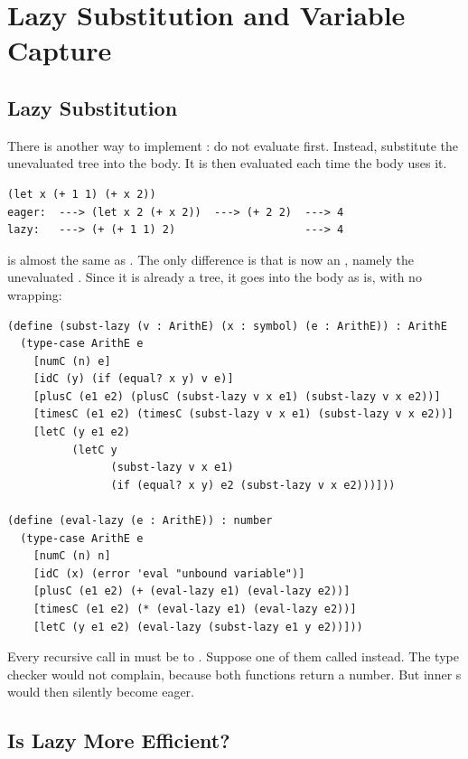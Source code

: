 \section{Lazy Substitution and Variable Capture}
\label{sec:lazy}

\subsection{Lazy Substitution}

There is another way to implement : do not evaluate  first. Instead, substitute the unevaluated tree into the body. It is then evaluated each time the body uses it.
\begin{lstlisting}[style=repl]
(let x (+ 1 1) (+ x 2))
eager:  ---> (let x 2 (+ x 2))  ---> (+ 2 2)  ---> 4
lazy:   ---> (+ (+ 1 1) 2)                    ---> 4
\end{lstlisting}
 is almost the same as . The only difference is that  is now an , namely the unevaluated . Since it is already a tree, it goes into the body as is, with no  wrapping:
\begin{lstlisting}
(define (subst-lazy (v : ArithE) (x : symbol) (e : ArithE)) : ArithE
  (type-case ArithE e
    [numC (n) e]
    [idC (y) (if (equal? x y) v e)]
    [plusC (e1 e2) (plusC (subst-lazy v x e1) (subst-lazy v x e2))]
    [timesC (e1 e2) (timesC (subst-lazy v x e1) (subst-lazy v x e2))]
    [letC (y e1 e2)
          (letC y
                (subst-lazy v x e1)
                (if (equal? x y) e2 (subst-lazy v x e2)))]))

(define (eval-lazy (e : ArithE)) : number
  (type-case ArithE e
    [numC (n) n]
    [idC (x) (error 'eval "unbound variable")]
    [plusC (e1 e2) (+ (eval-lazy e1) (eval-lazy e2))]
    [timesC (e1 e2) (* (eval-lazy e1) (eval-lazy e2))]
    [letC (y e1 e2) (eval-lazy (subst-lazy e1 y e2))]))
\end{lstlisting}

\begin{pitfall}
Every recursive call in  must be to . Suppose one of them called  instead. The type checker would not complain, because both functions return a number. But inner s would then silently become eager.
\end{pitfall}

\subsection{Is Lazy More Efficient?}

